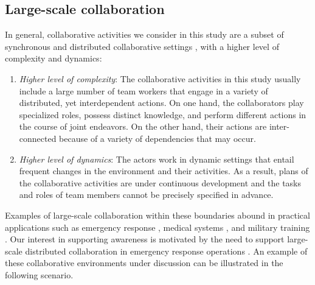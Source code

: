 \subsection{Large-scale collaboration} %
\label{sub:complex_collaboration}
In general, collaborative activities we consider in this study are a subset of synchronous and distributed collaborative settings \cite{Ellis1991}, with a higher level of complexity and dynamics:

\begin{enumerate}
\item \emph{Higher level of complexity}: The collaborative activities in this study usually include a large number of team workers that engage in a variety of distributed, yet interdependent actions. On one hand, the collaborators play specialized roles, possess distinct knowledge, and perform different actions in the course of joint endeavors. On the other hand, their actions are inter-connected because of a variety of dependencies that may occur. 

\item \emph{Higher level of dynamics}: The actors work in dynamic settings that entail frequent changes in the environment and their activities. As a result, plans of the collaborative activities are under continuous development and the tasks and roles of team members cannot be precisely specified in advance.
\end{enumerate}

Examples of large-scale collaboration within these boundaries abound in practical applications such as emergency response \cite{Turoff2004}, medical systems \cite{Blandford2004}, and military training \cite{mathieu2000influence}. Our interest in supporting awareness is motivated by the need to support large-scale distributed collaboration in emergency response operations \cite{Cai2005b,Cai2005a}. An example of these collaborative environments under discussion can be illustrated in the following scenario.


